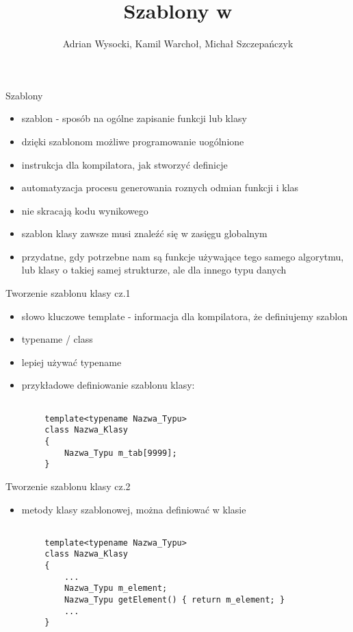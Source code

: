 \documentclass[11pt]{beamer}
\title{Szablony w \cpp}
\author[]{Adrian Wysocki, Kamil Warchoł, Michał Szczepańczyk}
\begin{document}
\begin{frame}
\titlepage
\end{frame}
\author{}
\begin{frame}{Szablony}
	\begin{itemize}
		 \item szablon - sposób na ogólne zapisanie funkcji lub klasy
		 \item dzięki szablonom możliwe programowanie uogólnione
		 \item instrukcja dla kompilatora, jak stworzyć definicje
		 \item automatyzacja procesu generowania roznych odmian funkcji i klas
		 \item nie skracają kodu wynikowego
		\item szablon klasy zawsze musi znaleźć się w zasięgu globalnym
		\item przydatne, gdy potrzebne nam są funkcje  używające tego samego algorytmu, lub klasy o takiej samej strukturze, ale dla innego typu danych
	\end{itemize}
\end{frame}



\begin{frame}[fragile]{Tworzenie szablonu klasy cz.1}
	\begin{itemize}
		\item słowo kluczowe template - informacja dla kompilatora, że definiujemy szablon
		\item typename / class
		\item lepiej używać typename
		\item przykładowe definiowanie szablonu klasy:
	\end{itemize}
	
	\begin{lstlisting}[frame=single]  % Start your code-block
		
		template<typename Nazwa_Typu>
		class Nazwa_Klasy
		{
			Nazwa_Typu m_tab[9999];
		}
	\end{lstlisting}
	

\end{frame}


\begin{frame}[fragile]{Tworzenie szablonu klasy cz.2}
	\begin{itemize}
		\item metody klasy szablonowej, można definiować w klasie
		\
	\end{itemize}
	
	\begin{lstlisting}[frame=single]  % Start your code-block
		
		template<typename Nazwa_Typu>
		class Nazwa_Klasy
		{
			...
			Nazwa_Typu m_element;
			Nazwa_Typu getElement() { return m_element; }
			...
		}
	\end{lstlisting}
	
\end{frame}
\end{document}
